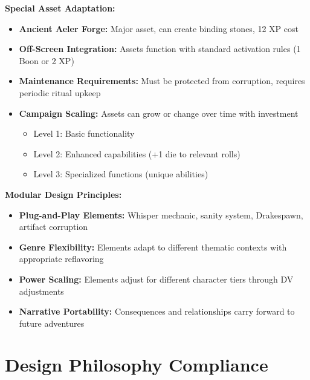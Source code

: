 \documentclass[11pt]{article}
\begin{document}
\begin{itemize}
\begin{itemize}
\begin{itemize}
\begin{itemize}
\begin{itemize}
\textbf{Special Asset Adaptation:} \begin{itemize} \item \textbf{Ancient Aeler Forge:} Major asset, can create binding stones, 12 XP cost \item \textbf{Off-Screen Integration:} Assets function with standard activation rules (1 Boon or 2 XP) \item \textbf{Maintenance Requirements:} Must be protected from corruption, requires periodic ritual upkeep \item \textbf{Campaign Scaling:} Assets can grow or change over time with investment \begin{itemize} \item Level 1: Basic functionality \item Level 2: Enhanced capabilities (+1 die to relevant rolls) \item Level 3: Specialized functions (unique abilities) \end{itemize} \end{itemize}

\textbf{Modular Design Principles:} \begin{itemize} \item \textbf{Plug-and-Play Elements:} Whisper mechanic, sanity system, Drakespawn, artifact corruption \item \textbf{Genre Flexibility:} Elements adapt to different thematic contexts with appropriate reflavoring \item \textbf{Power Scaling:} Elements adjust for different character tiers through DV adjustments \item \textbf{Narrative Portability:} Consequences and relationships carry forward to future adventures \end{itemize}

\section{Design Philosophy Compliance}


\end{itemize}
\end{itemize}
\end{itemize}
\end{itemize}
\end{itemize}
\end{document}
